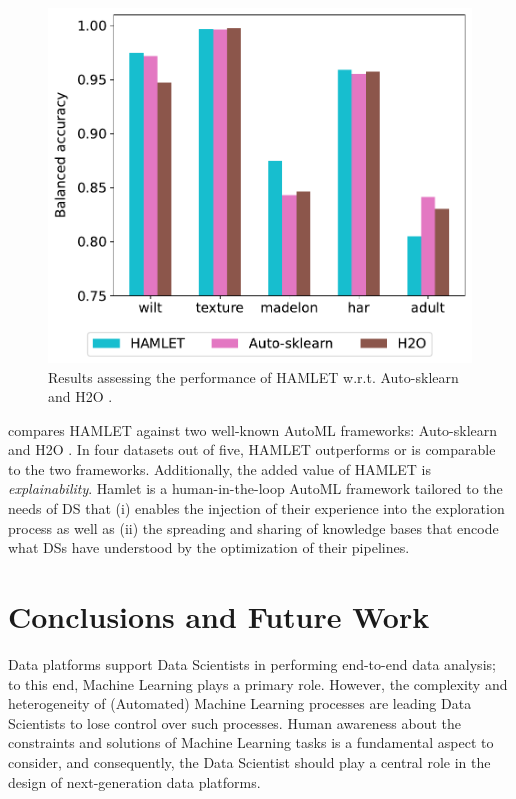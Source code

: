 \begin{figure}[t]
    \centering
    \includegraphics[scale=.45]{chapters/human-centric/hamlet/img/comparison.pdf}
    \caption{Results assessing the performance of HAMLET w.r.t. Auto-sklearn \cite{feurer2019auto} and H2O \cite{ledell2020h2o}.}
    \label{hamlet-fig:comparison}
\end{figure}


 compares HAMLET against two well-known AutoML frameworks: Auto-sklearn \cite{feurer2019auto} and H2O \cite{ledell2020h2o}.
In four datasets out of five, HAMLET outperforms or is comparable to the two frameworks.
Additionally, the added value of HAMLET is \textit{explainability}.
Hamlet is a human-in-the-loop AutoML framework tailored to the needs of DS that (i) enables the injection of their experience into the exploration process as well as (ii) the spreading and sharing of knowledge bases that encode what DSs have understood by the optimization of their pipelines.


\section{Conclusions and Future Work}\label{hamlet-sec:conclusion}

Data platforms support Data Scientists in performing end-to-end data analysis; to this end, Machine Learning plays a primary role.
However, the complexity and heterogeneity of (Automated) Machine Learning processes are leading Data Scientists to lose control over such processes.
Human awareness about the constraints and solutions of Machine Learning tasks is a fundamental aspect to consider, and consequently, the Data Scientist should play a central role in the design of next-generation data platforms.

